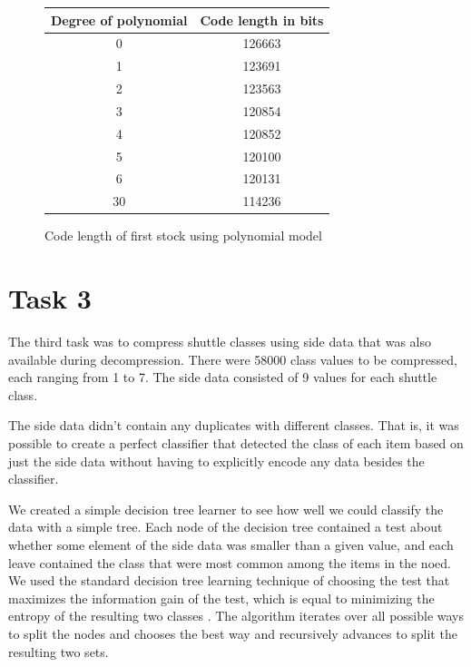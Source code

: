 \documentclass{article}
\begin{document}
\begin{figure}
\begin{center}
\begin{tabular}{|c|c|}
\hline
    Degree of polynomial & Code length in bits\\ \hline
    0      & 126663 \\  \hline
    1      & 123691 \\ \hline
    2      & 123563 \\ \hline
    3      & 120854 \\ \hline
    4      & 120852 \\ \hline
    5      & 120100 \\ \hline
    6      & 120131 \\ \hline
    30     & 114236 \\ \hline
\end{tabular}
\end{center}
\caption{Code length of first stock using polynomial model}
\label{ex2_polys}
\end{figure}

\section{Task 3}

The third task was to compress shuttle classes using side data that was also available during decompression.
There were 58000 class values to be compressed, each ranging from 1 to 7.
The side data consisted of 9 values for each shuttle class.

The side data didn't contain any duplicates with different classes.
That is, it was possible to create a perfect classifier that detected the class of each item based on just the side data without having to explicitly encode any data besides the classifier.

We created a simple decision tree learner to see how well we could classify the data with a simple tree.
Each node of the decision tree contained a test about whether some element of the side data was smaller than a given value, and each leave contained the class that were most common among the items in the noed.
We used the standard decision tree learning technique of choosing the test that maximizes the information gain of the test, which is equal to minimizing the entropy of the resulting two classes \cite{aima}.
The algorithm iterates over all possible ways to split the nodes and chooses the best way and recursively advances to split the resulting two sets.
\end{document}
